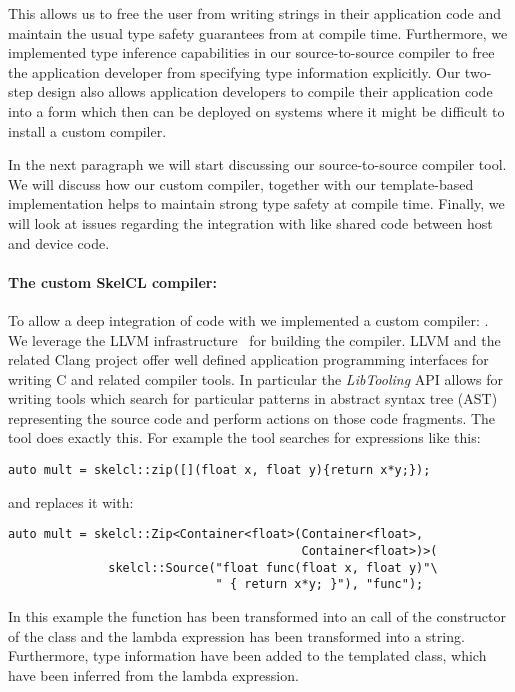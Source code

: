 This allows us to free the user from writing strings in their application code and maintain the usual type safety guarantees from \Cpp at compile time.
Furthermore, we implemented type inference capabilities in our source-to-source compiler to free the application developer from specifying type information explicitly.
Our two-step design also allows application developers to compile their application code into a form which then can be deployed on systems where it might be difficult to install a custom compiler.

In the next paragraph we will start discussing our source-to-source compiler tool.
We will discuss how our custom compiler, together with our template-based implementation helps to maintain strong type safety at compile time.
Finally, we will look at issues regarding the integration with \Cpp like shared code between host and device code.

\paragraph{The custom SkelCL compiler: }
To allow a deep integration of \SkelCL code with \Cpp we implemented a custom compiler: .
We leverage the LLVM infrastructure~\cite{Lattner2004} for building the compiler.
LLVM and the related Clang project offer well defined application programming interfaces for writing C and \Cpp related compiler tools.
In particular the \emph{LibTooling} API allows for writing tools which search for particular patterns in abstract syntax tree (AST) representing the source code and perform actions on those code fragments.
The  tool does exactly this.
For example the tool searches for expressions like this:
\begin{lstlisting}[numbers=none,label={lst:skelclc:before},caption={Code snippet before transformation.}]
auto mult = skelcl::zip([](float x, float y){return x*y;});
\end{lstlisting}
and replaces it with:
\begin{lstlisting}[numbers=none,label={lst:skelclc:after},caption={Code snippet after transformation.}]
auto mult = skelcl::Zip<Container<float>(Container<float>,
                                         Container<float>)>(
              skelcl::Source("float func(float x, float y)"\
                             " { return x*y; }"), "func");
\end{lstlisting}

In this example the  function has been transformed into an call of the constructor of the  class and the lambda expression has been transformed into a string.
Furthermore, type information have been added to the templated \code{Zip} class, which have been inferred from the lambda expression.

